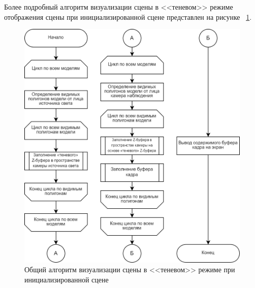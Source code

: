 Более подробный алгоритм визуализации сцены в <<теневом>> режиме отображения сцены при инициализированной сцене представлен на рисунке~
\ref{fig:shadow-mod}.
\begin{figure}[h] 
	\centering
	\includegraphics[width=1\textwidth]{images/shadow-mod.png}
	\caption{Общий алгоритм визуализации сцены в <<теневом>> режиме при инициализированной сцене} 
	\label{fig:shadow-mod} 
\end{figure}

\clearpage

